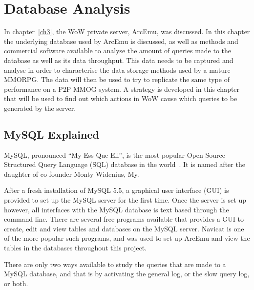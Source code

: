\chapter{Database Analysis}
\label{database}
In chapter~\ref{ch3}, the WoW private server, ArcEmu, was discussed. In this chapter the underlying database used by ArcEmu is discussed, as well as methods and commercial software available to analyse the amount of queries made to the database as well as its data throughput. This data needs to be captured and analyse in order to characterise the data storage methods used by a mature MMORPG. The data will then be used to try to replicate the same type of performance on a P2P MMOG system. 
A strategy is developed in this chapter that will be used to find out which actions in WoW cause which queries to be generated by the server.


\section{MySQL Explained}
MySQL, pronounced ``My Ess Que Ell'', is the most popular Open Source Structured Query Language (SQL) database in the world~\cite{mysqlhist}. It is named after the daughter of co-founder Monty Widenius, My. 

After a fresh installation of MySQL 5.5, a graphical user interface (GUI) is provided to set up the MySQL server for the first time. Once the server is set up however, all interfaces with the MySQL database is text based through the command line. There are several free programs available that provides a GUI to create, edit and view tables and databases on the MySQL server. Navicat is one of the more popular such programs, and was used to set up ArcEmu and view the tables in the databases throughout this project.

There are only two ways available to study the queries that are made to a MySQL database, and that is by activating the general log, or the slow query log, or both.

